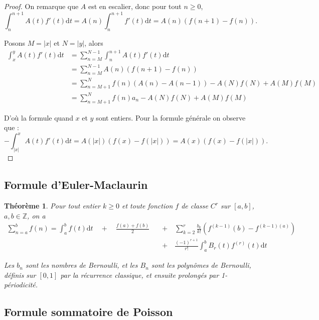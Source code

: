 \documentclass[french]{report}
\newtheorem{theorem}{Théorème}[section]
\begin{document}
\begin{proof}
  On remarque que $A$ est en escalier, donc pour tout $n\geq0$,
  \[ \int_n^{n+1}A(t)f'(t)\mathrm{d}t
  = A(n)\int_n^{n+1}f'(t)\mathrm{d}t
  = A(n)(f(n+1)-f(n)).
  \]

  Posons $M=|x|$ et $N=|y|$, alors
  \begin{align*}
    \int_x^yA(t)f'(t)\mathrm{d}t
    &= \sum_{n=M}^{N-1}\int_n^{n+1}A(t)f'(t)\mathrm{d}t \\
    &= \sum_{n=M}^{N-1}A(n)(f(n+1)-f(n)) \\
    &= \sum_{n=M+1}^Nf(n)(A(n)-A(n-1))-A(N)f(N)+A(M)f(M) \\
    &= \sum_{n=M+1}^Nf(n)a_n-A(N)f(N)+A(M)f(M)
  \end{align*}

  D'où la formule quand $x$ et $y$ sont entiers. Pour la formule générale on observe que :
  \[ -\int_{|x|}^xA(t)f'(t)\mathrm{d}t = A(|x|)(f(x)-f(|x|)) = A(x)(f(x)-f(|x|)). \]
  
\end{proof}

\subsection{Formule d'Euler-Maclaurin}

\begin{theorem}\label{eq:euler-maclaurin}
  Pour tout entier $k\geq0$ et toute fonction $f$ de classe $C^r$ sur $[a,b]$, $a,b\in\mathbb{Z}$, on a
  \begin{align*}
    \sum_{n=a}^b f(n) = \int_a^b f(t)\mathrm{d}t \quad + \quad \frac{f(a) + f(b)}{2} \quad &+ \quad \sum_{k=2}^r\frac{b_{k}}{k!}(f^{(k-1)}(b) - f^{(k-1)(a)}) \\
    &+ \quad \frac{(-1)^{r+1}}{r!}\int_a^b B_r(t)f^{(r)}(t)\mathrm{d}t
  \end{align*}

  Les $b_n$ sont les nombres de Bernoulli, et les $B_n$ sont les polynômes de Bernoulli, définis sur $[0,1]$ par la récurrence classique, et ensuite prolongés par 1-périodicité.
\end{theorem}

\subsection{Formule sommatoire de Poisson}
\end{document}

